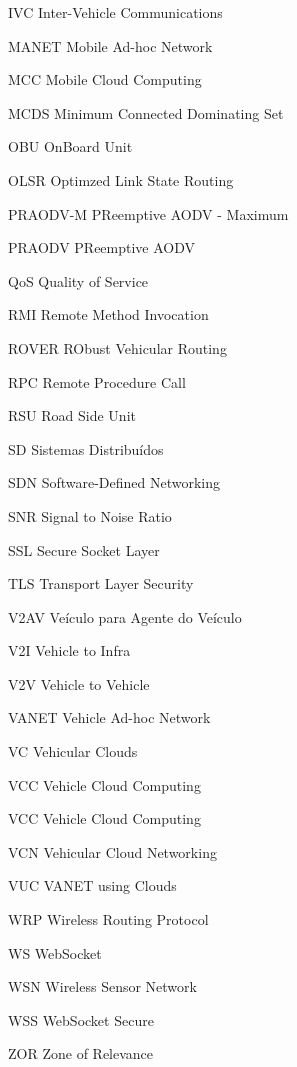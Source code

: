 \documentclass[
	12pt,				%
	oneside,			%
	a4paper,			%
	english,			%
	brazil				%
	]{abntex2ppgsi}
\begin{document}
\begin{siglas}
\item[IVC] Inter-Vehicle Communications
\item[MANET] Mobile Ad-hoc Network
\item[MCC] Mobile Cloud Computing
\item[MCDS]  Minimum Connected Dominating Set
\item[OBU] OnBoard Unit
\item[OLSR] Optimzed Link State Routing
\item[PRAODV-M] PReemptive AODV - Maximum
\item[PRAODV] PReemptive AODV
\item[QoS] Quality of Service
\item[RMI] Remote Method Invocation
\item[ROVER] RObust Vehicular Routing
\item[RPC] Remote Procedure Call
\item[RSU] Road Side Unit
\item[SD] Sistemas Distribuídos
\item[SDN] Software-Defined Networking
\item[SNR] Signal to Noise Ratio
\item[SSL] Secure Socket Layer
\item[TLS] Transport Layer Security
\item[V2AV] Veículo para Agente do Veículo
\item[V2I] Vehicle to  Infra
\item[V2V] Vehicle to Vehicle
\item[VANET] Vehicle Ad-hoc Network
\item[VC] Vehicular Clouds
\item[VCC] Vehicle Cloud Computing
\item[VCC] Vehicle Cloud Computing
\item[VCN] Vehicular Cloud Networking
\item[VUC] VANET using Clouds
\item[WRP] Wireless Routing Protocol
\item[WS] WebSocket 
\item[WSN] Wireless Sensor Network
\item[WSS] WebSocket Secure
\item[ZOR] Zone of Relevance	
	


\end{siglas}
\end{document}
